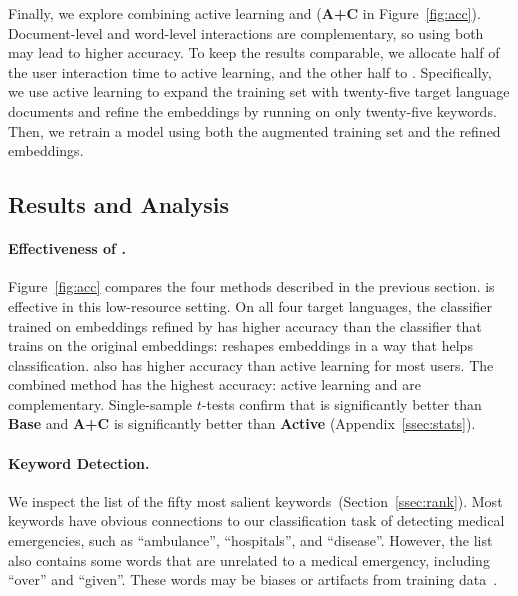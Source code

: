 Finally, we explore combining active learning and \name{}
(\textbf{A+C} in Figure~\ref{fig:acc}).
Document-level and word-level interactions are complementary, so
using both may lead to higher accuracy.
To keep the results comparable, we allocate half of the user interaction time
to active learning, and the other half to \name{}.
Specifically, we use active learning to expand the training set with twenty-five
target language documents and refine the embeddings by running \name{} on
only twenty-five keywords.  Then, we retrain a model using both the augmented
training set and the refined embeddings.

\subsection{Results and Analysis}
\label{ssec:analysis}

\paragraph{Effectiveness of \name{}.}

Figure~\ref{fig:acc} compares the four methods described in the previous
section.
\name{} is effective in this low-resource setting.
On all four target languages, the classifier trained on embeddings refined
by \name{} has higher accuracy than the classifier that trains on the original
embeddings: \name{} reshapes embeddings in a way that helps classification.
\name{} also has higher accuracy than active learning for most users.
The combined method has the highest accuracy: active learning and \name{} are
complementary.
Single-sample $t$-tests confirm that \textbf{\name{}} is significantly
better than \textbf{Base} and \textbf{A+C} is significantly better than
\textbf{Active} (Appendix~\ref{ssec:stats}).

\paragraph{Keyword Detection.}
We inspect the list of the fifty most salient keywords~(Section~\ref{ssec:rank}).
Most keywords have obvious connections to our classification task of detecting
medical emergencies, such as ``ambulance'', ``hospitals'', and ``disease''.
However, the list also contains some words that are unrelated
to a medical emergency, including ``over'' and ``given''.
These words may be biases or artifacts from training data~\citep{feng-18-fixed}.

